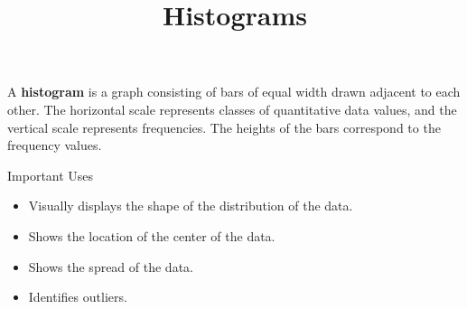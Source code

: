 \documentclass{beamer}
\title[MA205 - Section 2.2]{Histograms}
\begin{document}
\begin{frame}
\titlepage
\end{frame}

\begin{frame}
\begin{definition}
A \textbf{histogram} is a graph consisting of bars of equal width drawn adjacent to each other. The horizontal scale represents classes of quantitative data values, and the vertical scale represents frequencies. The heights of the bars correspond to the frequency values.
\end{definition}

\begin{block}{Important Uses}
\begin{itemize}
\item<2-> Visually displays the shape of the distribution of the data.
\item<3-> Shows the location of the center of the data.
\item<4-> Shows the spread of the data.
\item<5-> Identifies outliers.
\end{itemize}
\end{block}
\end{frame}
\end{document}
